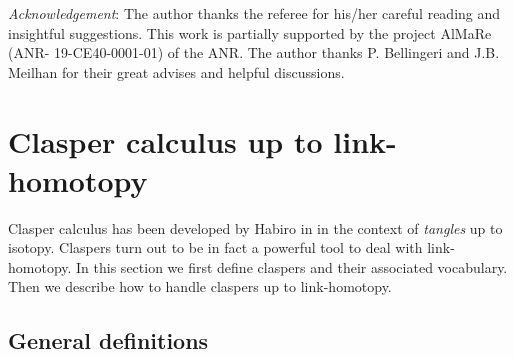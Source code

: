 \documentclass[11pt, a4paper, twoside,reqno]{amsart}
\begin{document}
\medskip\emph{Acknowledgement}: The author thanks the referee for his/her careful reading and insightful suggestions. This work is partially supported by the project AlMaRe (ANR-
19-CE40-0001-01) of the ANR. The author thanks P. Bellingeri  and J.B. Meilhan for their great advises and helpful discussions. 

\section{Clasper calculus up to link-homotopy}\label{sectionclaspcalc}

Clasper calculus has been developed by Habiro in \cite{HabiroClasp} in the context of \emph{tangles} up to isotopy. Claspers turn out to be in fact a powerful tool to deal with link-homotopy. In this section we first define claspers and their associated vocabulary. Then we describe how to handle claspers up to link-homotopy.
\subsection{General definitions}
\end{document}
